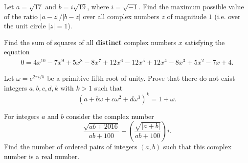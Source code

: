 %	



\begin{question}[name={2015 HMMT, Guts, Problem 26}]
	Let $a =\sqrt{17}$ and $b=i\sqrt{19}$, where $i=\sqrt{-1}$. Find the maximum possible value of the ratio $|a-z|/|b-z|$ over all complex numbers $z$ of magnitude $1$ (i.e. over the unit circle $|z|=1$).
\end{question}


%	






\begin{question}[name={2015 HMMT, Guts, Problem 30}]
	Find the sum of squares of all \textbf{distinct} complex numbers $x$ satisfying the equation
	\begin{align*}
		0 = 4x^{10} - 7x^{9} + 5x^8 - 8x^7 + 12x^6 - 12x^5 + 12x^4 - 8x^3 + 5x^2 - 7x + 4.
	\end{align*}
\end{question}


%	

\begin{question}[name={2015 HMIC, \href{https://artofproblemsolving.com/community/c129h1082121p4761636}{Problem 5}}]
	Let $\omega = e^{2\pi i /5}$ be a primitive fifth root of unity. Prove that there do not exist integers $a, b, c, d, k$ with $k > 1$ such that\[(a + b \omega + c \omega^2 + d \omega^3)^{k}=1+\omega.\]
\end{question}


%	



\begin{question}[name={2016 AIME I, \href{https://artofproblemsolving.com/community/c4p5966163}{Problem 7}}]
	For integers $a$ and $b$ consider the complex number\[\dfrac{\sqrt{ab+2016}}{ab+100} - \left(\frac{\sqrt{|a+b|}}{ab+100}\right)i.\]Find the number of ordered pairs of integers $(a, b)$ such that this complex number is a real number.
\end{question}


